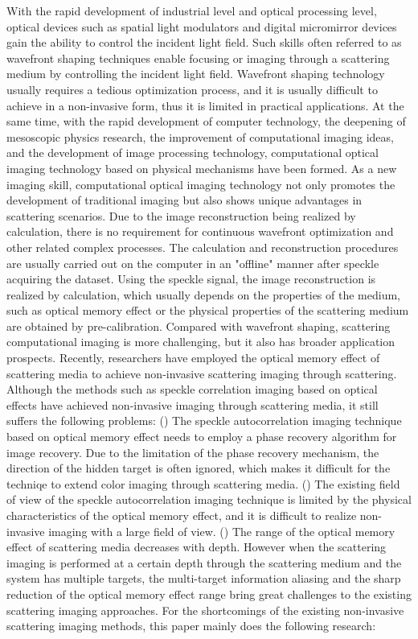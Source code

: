 \begin{englishabstract}
With the rapid development of industrial level and optical processing level,  optical devices such as spatial light modulators and digital micromirror devices gain the ability to control the incident light field. Such skills often referred to as wavefront shaping techniques enable focusing or imaging through a scattering medium by controlling the incident light field. Wavefront shaping technology usually requires a tedious optimization process, and it is usually difficult to achieve in a non-invasive form, thus it is limited in practical applications. At the same time, with the rapid development of computer technology, the deepening of mesoscopic physics research, the improvement of computational imaging ideas, and the development of image processing technology, computational optical imaging technology based on physical mechanisms have been formed. As a new imaging skill, computational optical imaging technology not only promotes the development of traditional imaging but also shows unique advantages in scattering scenarios. Due to the image reconstruction being realized by calculation, there is no requirement for continuous wavefront optimization and other related complex processes. The calculation and reconstruction procedures are usually carried out on the computer in an "offline" manner after speckle acquiring the dataset. Using the speckle signal, the image reconstruction is realized by calculation, which usually depends on the properties of the medium, such as optical memory effect or the physical properties of the scattering medium are obtained by pre-calibration. Compared with wavefront shaping, scattering computational imaging is more challenging, but it also has broader application prospects. Recently, researchers have employed the optical memory effect of scattering media to achieve non-invasive scattering imaging through scattering. Although the methods such as speckle correlation imaging based on optical effects have achieved non-invasive imaging through scattering media, it still suffers the following problems: () The speckle autocorrelation imaging technique based on optical memory effect needs to employ a phase recovery algorithm for image recovery. Due to the limitation of the phase recovery mechanism, the direction of the hidden target is often ignored, which makes it difficult for the techniqe to extend color imaging through scattering media. () The existing field of view of the speckle autocorrelation imaging technique is limited by the physical characteristics of the optical memory effect, and it is difficult to realize non-invasive imaging with a large field of view. () The range of the optical memory effect of scattering media decreases with depth. However when the scattering imaging is performed at a certain depth through the scattering medium and the system has multiple targets, the multi-target information aliasing and the sharp reduction of the optical memory effect range bring great challenges to the existing scattering imaging approaches. For the shortcomings of the existing non-invasive scattering imaging methods, this paper mainly does the following research:


\end{englishabstract}
